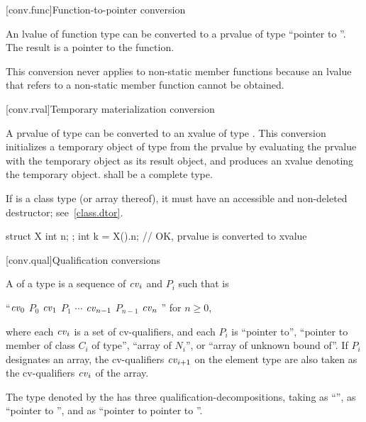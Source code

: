 [conv.func]{Function-to-pointer conversion}

\pnum
{}%
An lvalue of function type  can be converted to a prvalue of
type ``pointer to ''. The result is a pointer to the
function.
\begin{footnote}
This conversion never applies to non-static member functions because an
lvalue that refers to a non-static member function cannot be obtained.
\end{footnote}

[conv.rval]{Temporary materialization conversion}
%

\pnum
A prvalue of type  can be converted to an xvalue of type .
This conversion initializes a temporary object of type  from the prvalue
by evaluating the prvalue with the temporary object as its result object,
and produces an xvalue denoting the temporary object.
 shall be a complete type.
\begin{note}
If  is a class type (or array thereof),
it must have an accessible and non-deleted destructor;
see~\ref{class.dtor}.
\end{note}
\begin{example}
\begin{codeblock}
struct X { int n; };
int k = X().n;      // OK,  prvalue is converted to xvalue
\end{codeblock}
\end{example}

[conv.qual]{Qualification conversions}

%
\pnum
A  of a type 
is a sequence of
$\cv{}_i$ and $P_i$
such that  is
\begin{indented}
``$\cv{}_0$ $P_0$ $\cv{}_1$ $P_1$ $\cdots$ $\cv{}_{n-1}$ $P_{n-1}$ $\cv{}_n$ '' for $n \geq 0$,
\end{indented}
where
each $\cv{}_i$ is a set of cv-qualifiers, and
each $P_i$ is
``pointer to'',
``pointer to member of class $C_i$ of type'',
``array of $N_i$'', or
``array of unknown bound of''.
If $P_i$ designates an array,
the cv-qualifiers $\cv{}_{i+1}$ on the element type are also taken as
the cv-qualifiers $\cv{}_i$ of the array.
\begin{example}
The type denoted by the  
has three qualification-decompositions,
taking 
as ``'',
as ``pointer to '', and
as ``pointer to pointer to ''.
\end{example}

